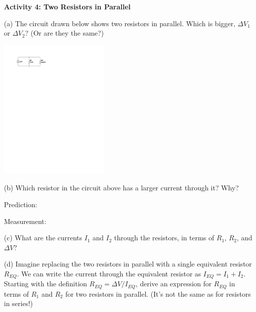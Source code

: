 \textbf{Activity 4: Two Resistors in Parallel} \par
\nopagebreak
(a)  The circuit drawn below shows two resistors in parallel.  Which is bigger, $\Delta V_1$ or $\Delta V_2$? (Or are they the same?)

\hspace{0.5 in}\includegraphics[width=0.4\textwidth]{electric_circuits2/circ_diag5_bw.pdf}
\vspace{0.2 in}

\pagebreak
(b) Which resistor in the circuit above has a larger current through it?   Why? 
 
\vspace{0.2 in}
\hspace{0.4 in} Prediction:
\answerspace{0.2 in}

\hspace{0.4 in} Measurement:  
\answerspace{0.2 in}

(c) What are the currents $I_1$ and $I_2$ through the resistors, in terms of $R_1$, $R_2$, and  $\Delta V$? 
\answerspace{0.6in}

(d) Imagine replacing the two resistors in parallel with a single equivalent resistor $R_{EQ}$.   We can write the current through the equivalent resistor as $I_{EQ}=I_1+I_2$.  Starting with the definition $R_{EQ}=  \Delta V \slash I_{EQ}$, derive an expression for $R_{EQ}$ in terms of $R_1$ and $R_2$ for two resistors in parallel.  (It's not the same as for resistors in series!)

